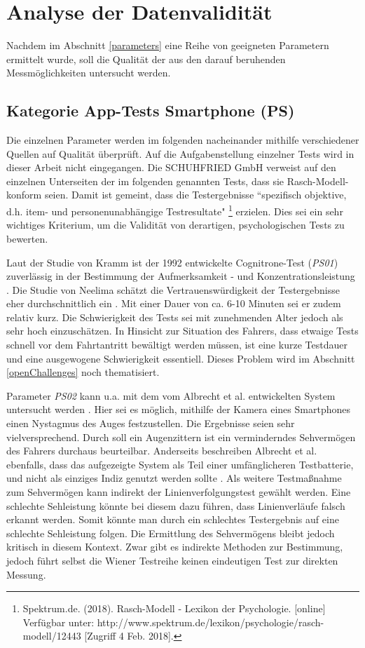 \section{Analyse der Datenvalidität}
\label{dataValidity}
Nachdem im Abschnitt \ref{parameters} eine Reihe von geeigneten Parametern ermittelt wurde, soll die Qualität der aus den darauf beruhenden Messmöglichkeiten untersucht werden.

\subsection{Kategorie App-Tests Smartphone (PS)}

Die einzelnen Parameter werden im folgenden nacheinander mithilfe verschiedener Quellen auf Qualität überprüft. Auf die Aufgabenstellung einzelner Tests wird in dieser Arbeit nicht eingegangen. Die SCHUHFRIED GmbH verweist auf den einzelnen Unterseiten der im folgenden genannten Tests, dass sie Rasch-Modell-konform seien. Damit ist gemeint, dass die Testergebnisse ``spezifisch objektive, d.h. item- und personenunabhängige Testresultate" \footnote{Spektrum.de. (2018). Rasch-Modell - Lexikon der Psychologie. [online] Verfügbar unter: http://www.spektrum.de/lexikon/psychologie/rasch-modell/12443 [Zugriff 4 Feb. 2018].} erzielen. Dies sei ein sehr wichtiges Kriterium, um die Validität von derartigen, psychologischen Tests zu bewerten.

Laut der Studie von Kramm ist der 1992 entwickelte Cognitrone-Test (\textit{PS01}) zuverlässig in der Bestimmung der Aufmerksamkeit - und Konzentrationsleistung \cite{studieaufmerksamkeitstests}. Die Studie von Neelima schätzt die Vertrauenswürdigkeit der Testergebnisse eher durchschnittlich ein \cite{indiaassessment}. Mit einer Dauer von ca. 6-10 Minuten sei er zudem relativ kurz. Die Schwierigkeit des Tests sei mit zunehmenden Alter jedoch als sehr hoch einzuschätzen. In Hinsicht zur Situation des Fahrers, dass etwaige Tests schnell vor dem Fahrtantritt bewältigt werden müssen, ist eine kurze Testdauer und eine ausgewogene Schwierigkeit essentiell. Dieses Problem wird im Abschnitt \ref{openChallenges} noch thematisiert.

Parameter \textit{PS02} kann u.a. mit dem vom Albrecht et al. entwickelten System untersucht werden \cite{mobilesmarttracking}. Hier sei es möglich, mithilfe der Kamera eines Smartphones einen Nystagmus des Auges festzustellen. Die Ergebnisse seien sehr vielversprechend. Durch soll ein Augenzittern ist ein verminderndes Sehvermögen des Fahrers durchaus beurteilbar. Anderseits beschreiben Albrecht et al. ebenfalls, dass das aufgezeigte System als Teil einer umfänglicheren Testbatterie, und nicht als einziges Indiz genutzt werden sollte \cite{mobilesmarttracking}. Als weitere Testmaßnahme zum Sehvermögen kann indirekt der Linienverfolgungstest gewählt werden. Eine schlechte Sehleistung könnte bei diesem dazu führen, dass Linienverläufe falsch erkannt werden. Somit könnte man durch ein schlechtes Testergebnis auf eine schlechte Sehleistung folgen. Die Ermittlung des Sehvermögens bleibt jedoch kritisch in diesem Kontext. Zwar gibt es indirekte Methoden zur Bestimmung, jedoch führt selbst die Wiener Testreihe keinen eindeutigen Test zur direkten Messung.

